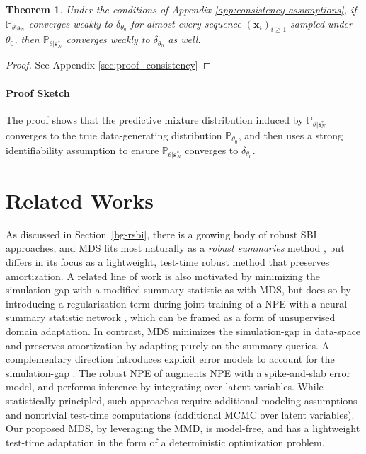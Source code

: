 \documentclass{article}
\theoremstyle{plain}
\newtheorem{theorem}{Theorem}[section]
\theoremstyle{definition}
\theoremstyle{remark}
\begin{document}
\begin{theorem} \label{thm:consistency}
Under the conditions of Appendix \ref{app:consistency assumptions}, if $\mathbb{P}_{\theta | \mathbf{s}_N}$ converges weakly to $\delta_{\theta_0}$ for almost every sequence $(\mathbf{x}_i)_{i \geq 1}$ sampled under $\theta_0$, then $\mathbb{P}_{\theta | \mathbf{s}^*_N}$ converges weakly to $\delta_{\theta_0}$ as well.
\end{theorem}

\begin{proof}
See Appendix \ref{sec:proof_consistency}
\end{proof}

\paragraph{Proof Sketch} The proof shows that the predictive mixture distribution induced by $\mathbb{P}_{\theta | \mathbf{s}^*_N}$ converges to the true data-generating distribution $\mathbb{P}_{\theta_0}$, and then uses a strong identifiability assumption to ensure $\mathbb{P}_{\theta | \mathbf{s}^*_N}$ converges to $\delta_{\theta_0}$.

\section{Related Works}
As discussed in Section~\ref{bg-rsbi}, there is a growing body of robust SBI approaches, and MDS fits most naturally as a \emph{robust summaries} method \citep{kellySimulationbasedBayesianInference2025b}, but differs in its focus as a lightweight, test-time robust method that preserves amortization. A related line of work is also motivated by minimizing the simulation-gap with a modified summary statistic as with MDS, but does so by introducing a regularization term during joint training of a NPE with a neural summary statistic network \citep{huangLearningRobustStatistics2023g, elsemullerDoesUnsupervisedDomain2025c}, which can be framed as a form of unsupervised domain adaptation. In contrast, MDS minimizes the simulation-gap in data-space and preserves amortization by adapting purely on the summary queries. A complementary direction introduces explicit error models to account for the simulation-gap \citep{wardRobustNeuralPosterior2022a, kelly2024misspecification}. The robust NPE of \citet{wardRobustNeuralPosterior2022a} augments NPE with a spike-and-slab error model, and performs inference by integrating over latent variables. While statistically principled, such approaches require additional modeling assumptions and nontrivial test-time computations (additional MCMC over latent variables). Our proposed MDS, by leveraging the MMD, is model-free, and has a lightweight test-time adaptation in the form of a deterministic optimization problem. 
\end{document}
